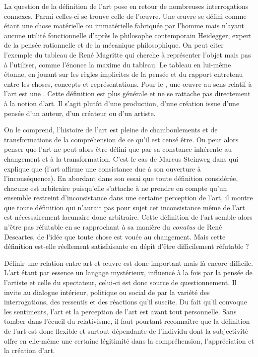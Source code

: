 \documentclass[12pt]{article} %
\begin{document}
La question de la définition de l'art pose en retour de nombreuses interrogations connexes. Parmi celles-ci se trouve celle de l'œuvre. Une œuvre se défini comme étant une chose matérielle ou immatérielle fabriquée par l'homme mais n'ayant aucune utilité fonctionnelle d'après le philosophe contemporain Heidegger, expert de la pensée rationnelle et de la mécanique philosophique. On peut citer l'exemple du tableau de René Magritte  qui cherche à représenter l'objet mais pas à l'utiliser, comme l'énonce la maxime  du tableau\cite{RMAgritte1929}. Le tableau en lui-même étonne, en jouant sur les règles implicites de la pensée et du rapport entretenu entre les choses, concepts et représentations. Pour le , une œuvre au sens relatif à l'art est une  \cite{LarousseOnline-oeuvre}. Cette définition est plus générale et ne se rattache pas directement à la notion d'art. Il s'agit plutôt d'une production, d'une création issue d'une pensée d'un auteur, d'un créateur ou d'un artiste.  

On le comprend, l'histoire de l'art est pleine de chamboulements et de transformations de la compréhension de ce qu'il est censé être. On peut alors penser que l'art ne peut alors être défini que par sa constance inhérente au changement et à la transformation. C'est le cas de Marcus Steinweg dans  qui explique que  (l'art affirme une consistance due à son ouverture à l'inconséquence). En abordant dans son essai que toute définition considérée, chacune est arbitraire puisqu'elle s'attache à ne prendre en compte qu'un ensemble restreint d'inconsistance dans une certaine perception de l'art, il montre que toute définition qui n'aurait pas pour sujet cet inconsistance même de l'art est nécessairement lacunaire donc arbitraire. Cette définition de l'art semble alors n'être pas réfutable en se rapprochant à sa manière du \textit{conatus} de René Descartes, de l'idée que toute chose est vouée au changement. Mais cette définition est-elle réellement satisfaisante en dépit d'être difficilement réfutable ?

Définir une relation entre art et œuvre est donc important mais là encore difficile.  L'art étant par essence un langage mystérieux, influencé à la fois par la pensée de l'artiste et celle du spectateur, celui-ci est donc source de questionnement. Il invite au dialogue intérieur, politique ou social de par la variété des interrogations, des ressentis et des réactions qu'il suscite. Du fait qu'il convoque les sentiments, l'art et la perception de l'art est avant tout personnelle. Sans tomber dans l'écueil du relativisme, il faut pourtant reconnaître que la définition de l'art est donc flexible et surtout dépendante de l'individu dont la subjectivité offre en elle-même une certaine légitimité dans la compréhension, l'appréciation et la création d'art. 
\end{document}
